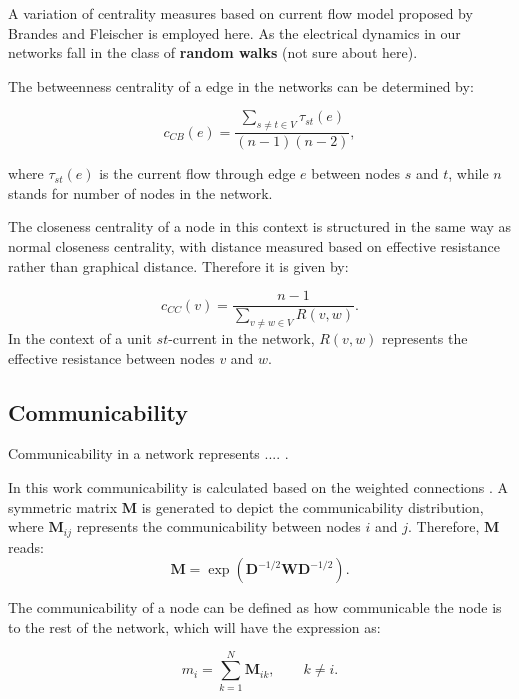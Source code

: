 \documentclass[%
 reprint,
 amsmath,amssymb,
 aps,
floatfix,
]{revtex4-2}
\begin{document}
A variation of centrality measures based on current flow model proposed by Brandes and Fleischer \cite{Brandes2005} is employed here. As the electrical dynamics in our networks fall in the class of \textbf{random walks} (not sure about here).

The betweenness centrality of a edge in the networks can be determined by:

\begin{equation}
c_{CB}(e) = \frac{\sum \limits_{s \neq t \in V}\tau_{st}(e)}{(n-1)(n-2)},
\label{eq:ebc}
\end{equation}



where $\tau_{st}(e)$ is the current flow through edge $e$ between nodes $s$ and $t$, while $n$ stands for number of nodes in the network.

The closeness centrality of a node in this context is structured in the same way as normal closeness centrality, with distance measured based on effective resistance rather than graphical distance. Therefore it is given by:

\begin{equation}
	c_{CC}(v) = \frac{n-1}{\sum \limits_{v \neq w \in V} R(v,w)}.
	\label{eq:ecc}
\end{equation}
In the context of a unit $st$-current in the network, $R(v,w)$ represents the effective resistance between nodes $v$ and $w$.

\subsection{\label{sec:level2} Communicability}
Communicability in a network represents .... \cite{Estrada2008}. 

In this work communicability is calculated based on the weighted connections \cite{Crofts2009}. A symmetric matrix $\mathbf M$ is generated to depict the communicability distribution, where $\mathbf M_{ij}$ represents the communicability between nodes $i$ and $j$. Therefore, $\mathbf M$ reads:
\begin{equation}
\mathbf M = \exp{(\mathbf D^{-1/2} \mathbf W \mathbf D^{-1/2})}.
\end{equation} 

The communicability of a node can be defined as how communicable the node is to the rest of the network, which will have the expression as:

\begin{equation}
	m_i = \sum \limits_{k = 1}^N \mathbf M_{ik}, \qquad k \neq i.
	\label{eq:ncomm}
\end{equation}
\end{document}
